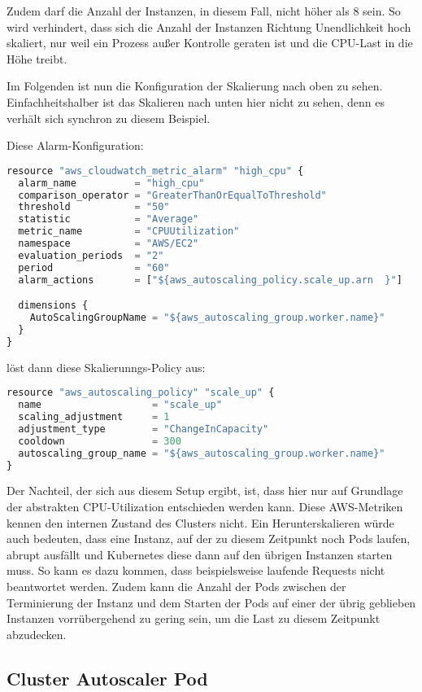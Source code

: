 Zudem darf die Anzahl der Instanzen, in diesem Fall, nicht höher als
8 sein. So wird verhindert,
dass sich die Anzahl der Instanzen Richtung Unendlichkeit hoch
skaliert,
nur weil ein Prozess außer Kontrolle geraten ist
und die CPU-Last in die Höhe treibt.

Im Folgenden ist nun die Konfiguration der Skalierung nach oben zu sehen.
Einfachheitshalber ist das Skalieren nach unten hier nicht zu sehen, denn es
verhält sich synchron zu diesem Beispiel.

Diese Alarm-Konfiguration:
\begin{lstlisting}[language=Python,numbers=none]
resource "aws_cloudwatch_metric_alarm" "high_cpu" {
  alarm_name          = "high_cpu"
  comparison_operator = "GreaterThanOrEqualToThreshold"
  threshold           = "50"
  statistic           = "Average"
  metric_name         = "CPUUtilization"
  namespace           = "AWS/EC2"
  evaluation_periods  = "2"
  period              = "60"
  alarm_actions       = ["${aws_autoscaling_policy.scale_up.arn  }"]

  dimensions {
    AutoScalingGroupName = "${aws_autoscaling_group.worker.name}"
  }
}\end{lstlisting}

löst dann diese Skalierunngs-Policy aus:
\begin{lstlisting}[language=Python,numbers=none]
resource "aws_autoscaling_policy" "scale_up" {
  name                   = "scale_up"
  scaling_adjustment     = 1
  adjustment_type        = "ChangeInCapacity"
  cooldown               = 300
  autoscaling_group_name = "${aws_autoscaling_group.worker.name}"
}\end{lstlisting}

Der Nachteil, der sich aus diesem Setup ergibt, ist, dass hier nur auf Grundlage
der abstrakten CPU-Utilization entschieden werden kann.
Diese AWS-Metriken kennen den internen Zustand des Clusters nicht.
Ein Herunterskalieren
würde auch bedeuten, dass eine Instanz, auf der zu diesem Zeitpunkt noch Pods
laufen, abrupt ausfällt und Kubernetes diese dann auf den übrigen Instanzen
starten muss. So kann es dazu kommen, dass beispielsweise laufende Requests
nicht beantwortet
werden. Zudem kann die Anzahl der Pods zwischen der Terminierung der
Instanz und dem
Starten der Pods auf einer der übrig geblieben Instanzen vorrübergehend
zu gering sein,
um die Last zu diesem Zeitpunkt abzudecken.

\subsection{Cluster Autoscaler Pod}

